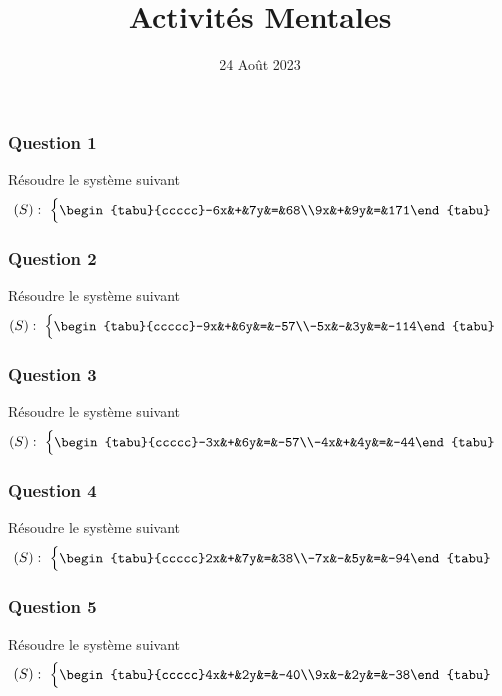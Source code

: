 \documentclass[15pt, mathserif]{beamer}
\title{Activités Mentales}
\date{24 Août 2023}
\newenvironment{eq}{\begin{cases}\begin{tabu}{ccccc}}{\end{tabu}\end{cases}}
\begin{document}
\begin{frame}
    \titlepage
\end{frame}

\begin{frame} 
	\frametitle{Question 1}
Résoudre le système suivant \[(S):~\begin{eq}-6x&+&7y&=&68\\9x&+&9y&=&171\end{eq}\]\end{frame}


\begin{frame} 
	\frametitle{Question 2}
Résoudre le système suivant \[(S):~\begin{eq}-9x&+&6y&=&-57\\-5x&-&3y&=&-114\end{eq}\]\end{frame}


\begin{frame} 
	\frametitle{Question 3}
Résoudre le système suivant \[(S):~\begin{eq}-3x&+&6y&=&-57\\-4x&+&4y&=&-44\end{eq}\]\end{frame}


\begin{frame} 
	\frametitle{Question 4}
Résoudre le système suivant \[(S):~\begin{eq}2x&+&7y&=&38\\-7x&-&5y&=&-94\end{eq}\]\end{frame}


\begin{frame} 
	\frametitle{Question 5}
Résoudre le système suivant \[(S):~\begin{eq}4x&+&2y&=&-40\\9x&-&2y&=&-38\end{eq}\]\end{frame}
\end{document}
